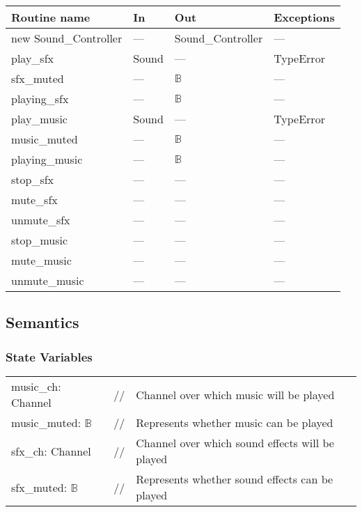 \documentclass[12pt]{article}
\begin{document}
\begin{tabular}{| l | l | l | p{5cm} |}
\hline
\textbf{Routine name} & \textbf{In} & \textbf{Out} & \textbf{Exceptions}\\
\hline
new Sound\_Controller & --- & Sound\_Controller & ---\\
\hline
play\_sfx             & Sound & ---          & TypeError\\
\hline
sfx\_muted            & ---   & $\mathbb{B}$ & ---\\
\hline
playing\_sfx          & ---   & $\mathbb{B}$ & ---\\
\hline
play\_music           & Sound & ---          & TypeError\\
\hline
music\_muted          & ---   & $\mathbb{B}$ & ---\\
\hline
playing\_music        & ---   & $\mathbb{B}$ & ---\\
\hline
stop\_sfx             & ---   & ---          & ---\\
\hline
mute\_sfx             & ---   & ---          & ---\\
\hline
unmute\_sfx           & ---   & ---          & ---\\
\hline
stop\_music           & ---   & ---          & ---\\
\hline
mute\_music           & ---   & ---          & ---\\
\hline
unmute\_music         & ---   & ---          & ---\\
\hline
\end{tabular}

\subsection* {Semantics}

\subsubsection* {State Variables}

\begin{tabular}{lll}
    music\_ch: Channel         & // & Channel over which music will be played\\ 
    music\_muted: $\mathbb{B}$ & // & Represents whether music can be played\\
    sfx\_ch: Channel           & // & Channel over which sound effects will be played\\
    sfx\_muted: $\mathbb{B}$   & // & Represents whether sound effects can be played
\end{tabular}
\end{document}
